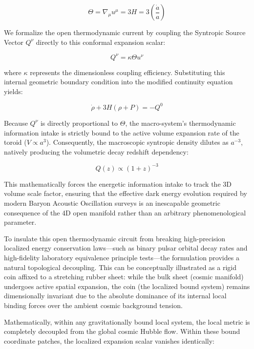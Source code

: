 \documentclass[aps,prd,10pt,onecolumn,superscriptaddress,nofootinbib]{revtex4-2}
\begin{document}
\begin{equation}
\Theta = \nabla_\mu u^\mu = 3H = 3\left(\frac{\dot{a}}{a}\right)
\end{equation}

We formalize the open thermodynamic current by coupling the Syntropic Source Vector $Q^\nu$ directly to this conformal expansion scalar:

\begin{equation}
Q^\nu = \kappa \Theta u^\nu
\end{equation}

where $\kappa$ represents the dimensionless coupling efficiency. Substituting this internal geometric boundary condition into the modified continuity equation yields:

\begin{equation}
\dot{\rho} + 3H(\rho + P) = -Q^0
\end{equation}

Because $Q^\nu$ is directly proportional to $\Theta$, the macro-system's thermodynamic information intake is strictly bound to the active volume expansion rate of the toroid ($V \propto a^3$). Consequently, the macroscopic syntropic density dilutes as $a^{-3}$, natively producing the volumetric decay redshift dependency:

\begin{equation}
Q(z) \propto (1+z)^{-3}
\end{equation}

This mathematically forces the energetic information intake to track the 3D volume scale factor, ensuring that the effective dark energy evolution required by modern Baryon Acoustic Oscillation surveys is an inescapable geometric consequence of the 4D open manifold rather than an arbitrary phenomenological parameter.

To insulate this open thermodynamic circuit from breaking high-precision localized energy conservation laws—such as binary pulsar orbital decay rates and high-fidelity laboratory equivalence principle tests—the formulation provides a natural topological decoupling. This can be conceptually illustrated as a rigid coin affixed to a stretching rubber sheet: while the bulk sheet (cosmic manifold) undergoes active spatial expansion, the coin (the localized bound system) remains dimensionally invariant due to the absolute dominance of its internal local binding forces over the ambient cosmic background tension. 

Mathematically, within any gravitationally bound local system, the local metric is completely decoupled from the global cosmic Hubble flow. Within these bound coordinate patches, the localized expansion scalar vanishes identically:
\end{document}
